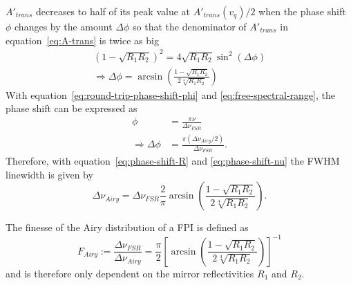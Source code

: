 $A'_{trans}$ decreases to half of its peak value at $A'_{trans}(v_q) / 2$ when the phase shift $\phi$ changes by the amount $\Delta\phi$ so that the denominator of $A'_{trans}$ in equation~\eqref{eq:A-trans}  is twice as big
\begin{align}
\left(1-\sqrt{R_1R_2}\right)^2=4\sqrt{R_1R_2}\sin^2(\Delta\phi) \\
\label{eq:phase-shift-R}
\Rightarrow \Delta\phi=\arcsin\left(\frac{1-\sqrt{R_1R_2}}{2\sqrt[4]{R_1R_2}}\right)
\end{align}
With equation~\eqref{eq:round-trip-phase-shift-phi} and \eqref{eq:free-spectral-range}, the phase shift can be expressed as
\begin{align}
\phi &= \frac{\pi \nu}{\Delta \nu_{FSR}} \\
\label{eq:phase-shift-nu}
\Rightarrow \Delta \phi &= \frac{\pi (\Delta \nu_{Airy}/2)}{\Delta \nu_{FSR}}.
\end{align}
Therefore, with equation~\eqref{eq:phase-shift-R} and \eqref{eq:phase-shift-nu} the \ac{FWHM} linewidth is given by
\begin{equation}
\Delta \nu_{Airy} = \Delta \nu_{FSR}\frac{2}{\pi}\arcsin\left(\frac{1-\sqrt{R_1R_2}}{2\sqrt[4]{R_1R_2}}\right).
\end{equation}

The finesse of the Airy distribution of a \ac{FPI} is defined as
\begin{equation}
\label{eq:f-airy}
F_{Airy} := \frac{\Delta \nu_{FSR}}{\Delta \nu_{Airy}} = \frac{\pi}{2}\left[\arcsin\left(\frac{1-\sqrt{R_1R_2}}{2\sqrt[4]{R_1R_2}}\right)\right]^{-1}
\end{equation}
and is therefore only dependent on the mirror reflectivities $R_1$ and $R_2$.

